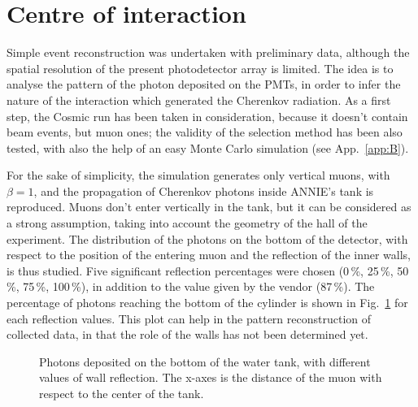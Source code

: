 \section{Centre of interaction}
\label{sec:centre}

 Simple event reconstruction was undertaken with preliminary data, although the spatial resolution of the %
 present photodetector array is limited.
 The idea is to analyse the pattern of the photon deposited on the PMTs, in order to infer the nature of %
 the interaction which generated the Cherenkov radiation.
 As a first step, the Cosmic run has been taken in consideration, because it doesn't contain beam events, %
 but muon ones; the validity of the selection method has been also tested, with also the help of an easy %
 Monte Carlo simulation (see App.~\ref{app:B}).

 For the sake of simplicity, the simulation generates only vertical muons, with $\beta = 1$, and %
 the propagation of Cherenkov photons inside ANNIE's tank is reproduced.
 Muons don't enter vertically in the tank, but it can be considered as a strong assumption, %
 taking into account the geometry of the hall of the experiment.
 The distribution of the photons on the bottom of the detector, with respect to the position of the %
 entering muon and the reflection of the inner walls, is thus studied.
 Five significant reflection percentages were chosen (0\,\%, 25\,\%, 50\,\%, 75\,\%, 100\,\%), %
 in addition to the value given by the vendor (87\,\%).
 The percentage of photons reaching the bottom of the cylinder is shown in Fig.~\ref{fig:reflect} %
 for each reflection values.
 This plot can help in the pattern reconstruction of collected data, in that the role of the walls has not %
 been determined yet.

\begin{figure}
  \centering
   \hfill 
    \caption{Photons deposited on the bottom of the water tank, with different values of wall reflection.
    The x-axes is the distance of the muon with respect to the center of the tank.}
  \label{fig:reflect}
\end{figure}


